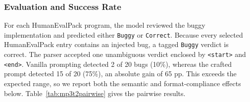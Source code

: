 \documentclass[sigconf,nonacm]{acmart}
\begin{document}
\subsubsection{Evaluation and Success Rate}\hfill\break
For each HumanEvalPack program, the model reviewed the buggy implementation and
predicted either \texttt{Buggy} or \texttt{Correct}. Because every selected
HumanEvalPack entry contains an injected bug, a tagged \texttt{Buggy} verdict is
correct. The parser accepted one unambiguous verdict enclosed by
\texttt{<start>} and \texttt{<end>}. Vanilla prompting detected 2 of 20 bugs
(10\%), whereas the crafted prompt detected 15 of 20 (75\%), an absolute gain
of 65 pp. This exceeds the expected range, so we report both the semantic and
format-compliance effects below. Table~\ref{tab:mp3t2pairwise} gives the
pairwise results.
\end{document}
